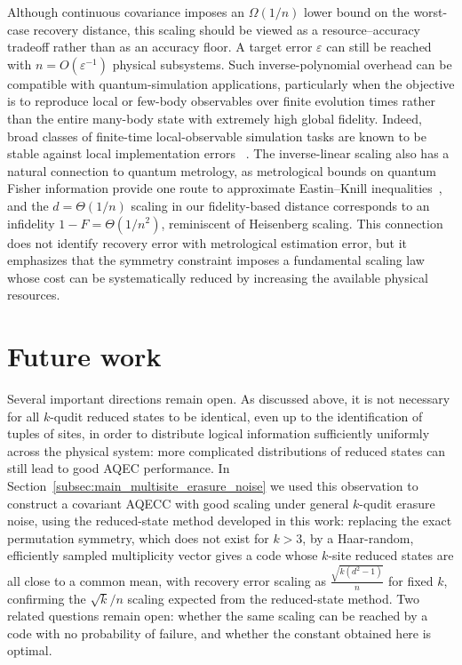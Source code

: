 \documentclass[10pt,twocolumn,superscriptaddress,aps,amsmath,amssymb,citeautoscript,floatfix,prx]{revtex4-2}
\theoremstyle{plain}
\theoremstyle{plain}
\theoremstyle{plain}
\theoremstyle{plain}
\theoremstyle{plain}
\theoremstyle{plain}
\theoremstyle{plain}
\theoremstyle{definition}
\theoremstyle{plain}
\begin{document}
Although continuous covariance imposes an $\Omega(1/n)$ lower bound on
the worst-case recovery distance, this scaling should be viewed as a
resource--accuracy tradeoff rather than as an accuracy floor.  A target
error $\varepsilon$ can still be reached with
$n=O(\varepsilon^{-1})$ physical subsystems.  Such inverse-polynomial
overhead can be compatible with quantum-simulation applications,
particularly when the objective is to reproduce local or few-body
observables over finite evolution times rather than the entire
many-body state with extremely high global fidelity. Indeed, broad
classes of finite-time local-observable simulation tasks are known to
be stable against local implementation errors
~\cite{Trivedi2024AnalogStability}.  The inverse-linear scaling also has
a natural connection to quantum metrology, as metrological bounds on
quantum Fisher information provide one route to approximate
Eastin--Knill inequalities~\cite{Kubica2021,Zhou2021}, and the
$d=\Theta(1/n)$ scaling in our fidelity-based distance corresponds to an
infidelity $1-F=\Theta(1/n^2)$, reminiscent of Heisenberg scaling.
This connection does not identify recovery error with metrological
estimation error, but it emphasizes that the symmetry constraint
imposes a fundamental scaling law whose cost can be systematically
reduced by increasing the available physical resources.

\section{Future work}\label{sec:main_future_work}

Several important directions remain open.
As discussed above, it is not necessary for all \(k\)-qudit reduced states to be identical, even up to the identification of tuples of sites, 
in order to distribute logical information sufficiently uniformly across the physical system: more complicated distributions of reduced states 
can still lead to good AQEC performance. In Section~\ref{subsec:main_multisite_erasure_noise} we used this observation to construct a covariant 
AQECC with good scaling under general \(k\)-qudit erasure noise, using the reduced-state method developed in this work: replacing the exact permutation symmetry, 
which does not exist for $k>3$, by a Haar-random, efficiently sampled multiplicity vector gives a code whose \(k\)-site reduced states are all close to a common mean, 
with recovery error scaling as
$
    \frac{\sqrt{k(d^2-1)}}{n}
$
for fixed \(k\), confirming the \(\sqrt k/n\) scaling expected from the reduced-state method. Two related questions remain open: 
whether the same scaling can be reached by a code with no probability of failure, and whether the constant obtained here is optimal.
\end{document}
